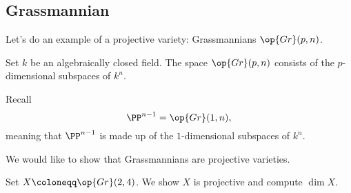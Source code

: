 \documentclass[../notes.tex]{subfiles}
\begin{document}
\subsection{Grassmannian}
Let's do an example of a projective variety: Grassmannians $\op{Gr}(p,n)$. 
\begin{definition}[Grassmannian]
	Set $k$ be an algebraically closed field. The space $\op{Gr}(p,n)$ consists of the $p$-dimensional subspaces of $k^n$.
\end{definition}
\begin{example}
	Recall
	\[\PP^{n-1}=\op{Gr}(1,n),\]
	meaning that $\PP^{n-1}$ is made up of the $1$-dimensional subspaces of $k^n$.
\end{example}
We would like to show that Grassmannians are projective varieties.
\begin{exe}
	Set $X\coloneqq\op{Gr}(2,4)$. We show $X$ is projective and compute $\dim X$.
\end{exe}
\end{document}
